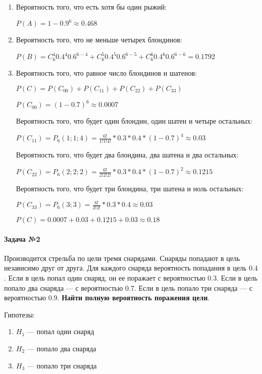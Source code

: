 \documentclass{article}
\begin{document}
\begin{enumerate}
    \item Вероятность того, что есть хотя бы один рыжий:

    $P(A) = 1 - 0.9^6 \approx 0.468$
    \item Вероятность того, что не меньше четырех блондинов:

    $P(B) = C_{6}^{4} 0.4^{4} 0.6^{6 - 4} + C_{6}^{5} 0.4^{5} 0.6^{6 - 5} + C_{6}^{6} 0.4^{6} 0.6^{6 - 6} = 0.1792$
    \item Вероятность того, что равное число блондинов и шатенов:
    
    $P(C) = P(C_{00}) + P(C_{11}) + P(C_{22}) + P(C_{33})$

    $P(C_{00}) = (1-0.7)^{6} \approx 0.0007$

    Вероятность того, что будет один блондин, один шатен и четыре остальных:

    $P(C_{11}) = P_6(1; 1; 4) = \frac{6!}{1!1!4!} * 0.3 * 0.4 * (1 - 0.7)^4 \approx 0.03$

    Вероятность того, что будет два блондина, два шатена и два остальных:

    $P(C_{22}) = P_6(2; 2; 2) = \frac{6!}{2!2!2!} * 0.3 * 0.4 * (1 - 0.7)^2 \approx 0.1215$

    Вероятность того, что будет три блондина, три шатена и ноль остальных:

    $P(C_{33}) = P_6(3; 3) = \frac{6!}{3!3!} * 0.3 * 0.4 \approx 0.03$

    $P(C) = 0.0007 + 0.03 + 0.1215 + 0.03 \approx 0.18$
\end{enumerate}

\paragraph{Задача №2}

Производится стрельба по цели тремя снарядами. Снаряды попадают в цель независимо друг от друга. Для каждого снаряда вероятность попадания в цель $0.4$. Если в цель попал один снаряд, он ее поражает с вероятностью $0.3$. Если в цель попало два снаряда — с вероятностью $0.7$. Если в цель попало три снаряда — с вероятностью $0.9$. \textbf{Найти полную вероятность поражения цели}.

Гипотезы:

\begin{enumerate}
    \item $H_{1}$ — попал один снаряд
    \item $H_{2}$ — попало два снаряда
    \item $H_{3}$ — попало три снаряда
\end{enumerate}
\end{document}
